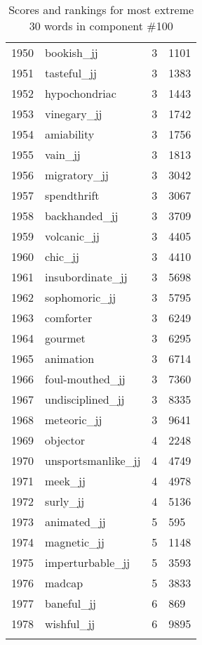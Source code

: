 \begin{longtable}[!htbp]{| rlr@{.}l |}
    1950 & bookish\_jj & 3 & 1101 \\
    1951 & tasteful\_jj & 3 & 1383 \\
    1952 & hypochondriac & 3 & 1443 \\
    1953 & vinegary\_jj & 3 & 1742 \\
    1954 & amiability & 3 & 1756 \\
    1955 & vain\_jj & 3 & 1813 \\
    1956 & migratory\_jj & 3 & 3042 \\
    1957 & spendthrift & 3 & 3067 \\
    1958 & backhanded\_jj & 3 & 3709 \\
    1959 & volcanic\_jj & 3 & 4405 \\
    1960 & chic\_jj & 3 & 4410 \\
    1961 & insubordinate\_jj & 3 & 5698 \\
    1962 & sophomoric\_jj & 3 & 5795 \\
    1963 & comforter & 3 & 6249 \\
    1964 & gourmet & 3 & 6295 \\
    1965 & animation & 3 & 6714 \\
    1966 & foul-mouthed\_jj & 3 & 7360 \\
    1967 & undisciplined\_jj & 3 & 8335 \\
    1968 & meteoric\_jj & 3 & 9641 \\
    1969 & objector & 4 & 2248 \\
    1970 & unsportsmanlike\_jj & 4 & 4749 \\
    1971 & meek\_jj & 4 & 4978 \\
    1972 & surly\_jj & 4 & 5136 \\
    1973 & animated\_jj & 5 & 595 \\
    1974 & magnetic\_jj & 5 & 1148 \\
    1975 & imperturbable\_jj & 5 & 3593 \\
    1976 & madcap & 5 & 3833 \\
    1977 & baneful\_jj & 6 & 869 \\
    1978 & wishful\_jj & 6 & 9895 \\
    \hline
    \caption{Scores and rankings for most extreme 30 words in component \#100} \\
\end{longtable}
